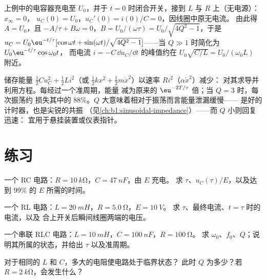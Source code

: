 \begin{example}[初始条件]\label{ex:b1:transient-regimes:ic}
上例中的电容器充电至 $U_0$，并于
$t = 0$ 时闭合开关，接到 $L$ 与 $R$ 上（无电源）：$x_\infty = 0$，
$u_C(0) = U_0$，$u_C'(0) = i(0)/C = 0$，因线圈中原无电流。
由此得 $A = U_0$，且 $-A/\tau + B\omega = 0$，$B = U_0/(\omega\tau) =
U_0/\sqrt{4Q^2 - 1}$，于是 $u_C = U_0\eu^{-t/\tau}[\cos\omega t + \sin(\omega
t)/\sqrt{4Q^2 - 1}]$——当 $Q \gg 1$ 时简化为 $U_0\eu^{-t/\tau}\cos\omega_0 t$，
而电流 $i = -C\,\dd u_C/\dd t$ 的峰值约在 $U_0\sqrt{C/L} =
U_0/(\omega_0 L)$ 附近。
\end{example}

\begin{remark}[能量]\label{rem:b1:transient-regimes:energy}
储存能量 $\tfrac12 Cu_C^2 + \tfrac12 Li^2$（或 $\tfrac12 kx^2
+ \tfrac12 m\dot x^2$）以速率 $Ri^2$（$\alpha\dot x^2$）减少：
对其求导并利用方程。每经过一个准周期，能量
减为原来的 $\eu^{-2T/\tau}$ 倍；当 $Q = 3$ 时，每次振荡约
损失其中的 $88\%$。$Q$ 大意味着相对于振荡而言能量泄漏缓慢——
是好的计时器，也是尖锐的共振
（见\cref{ch:b1:sinusoidal-impedance}）——而 $Q$ 小则回复迅速：
宜用于悬挂装置或仪表指针。
\end{remark}

\section{练习}

\begin{exercise}[$\star$]\label{exo:b1:transient-regimes:1}
一个 RC 电路：$R = \qty{10}{k\ohm}$，$C = \qty{47}{nF}$，由 $E$ 充电。
求 $\tau$、$u_C(\tau)/E$，以及达到 $99\%$ 的 $E$ 所需的时间。
\end{exercise}

\begin{exercise}[$\star$]\label{exo:b1:transient-regimes:2}
一个 RL 电路：$L = \qty{20}{mH}$，$R = \qty{5.0}{\ohm}$，$E = \qty{10}{V}$。
求 $\tau$、最终电流、$t = \tau$ 时的电流，以及
合上开关后瞬间线圈两端的电压。
\end{exercise}

\begin{exercise}[$\star$]\label{exo:b1:transient-regimes:3}
一个串联 RLC 电路：$L = \qty{10}{mH}$，$C = \qty{100}{nF}$，$R = \qty{100}{\ohm}$。
求 $\omega_0$、$f_0$、$Q$；说明其所属的状态，并给出
$\tau$ 以及准周期。
\end{exercise}

\begin{exercise}[$\star$]\label{exo:b1:transient-regimes:4}
对于相同的 $L$ 和 $C$，多大的电阻使电路处于临界状态？
此时 $Q$ 为多少？若 $R = \qty{2}{k\ohm}$，会发生什么？
\end{exercise}

